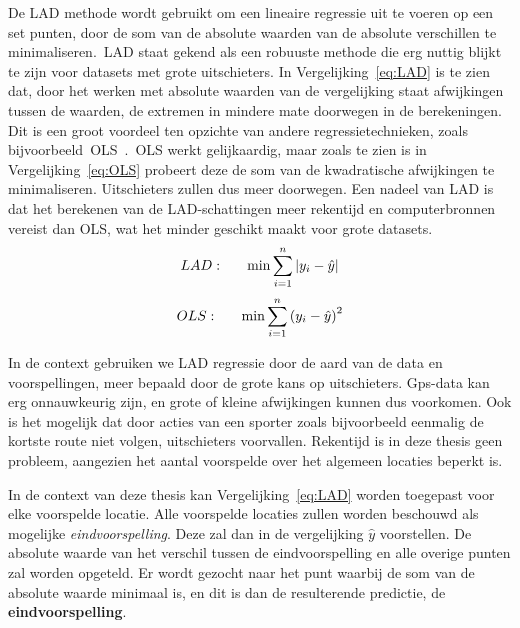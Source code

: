 De \ac{LAD} methode wordt gebruikt om een lineaire regressie uit te voeren op
een set punten, door de som van de absolute waarden van de absolute verschillen
te minimaliseren.\ \ac{LAD} staat gekend als een robuuste methode die erg
nuttig blijkt te zijn voor datasets met grote uitschieters. In
Vergelijking~\ref{eq:LAD} is te zien dat, door het werken met absolute waarden
van de vergelijking staat afwijkingen tussen de waarden, de extremen in mindere
mate doorwegen in de berekeningen. Dit is een groot voordeel ten opzichte van
andere regressietechnieken, zoals
bijvoorbeeld~\ac{OLS}~\cite{iqbal2021application}.~\ac{OLS} werkt gelijkaardig,
maar zoals te zien is in Vergelijking~\ref{eq:OLS} probeert deze de som van de
kwadratische afwijkingen te minimaliseren. Uitschieters zullen dus meer
doorwegen. Een nadeel van \ac{LAD} is dat het berekenen van de LAD-schattingen
meer rekentijd en computerbronnen vereist dan \ac{OLS}, wat het minder geschikt
maakt voor grote datasets.
\begin{equation} \label{eq:LAD}
    LAD:\indent  \min\sum\limits_{i=1}^n|y_i - \hat{y}|
\end{equation}
\begin{equation} \label{eq:OLS}
    OLS:\indent  \min\sum\limits_{i=1}^n{(y_i - \hat{y})}^2
\end{equation}

In de context gebruiken we LAD regressie door de aard van de data en
voorspellingen, meer bepaald door de grote kans op uitschieters. Gps-data kan
erg onnauwkeurig zijn, en grote of kleine afwijkingen kunnen dus voorkomen. Ook
is het mogelijk dat door acties van een sporter zoals bijvoorbeeld eenmalig de
kortste route niet volgen, uitschieters voorvallen. Rekentijd is in deze thesis
geen probleem, aangezien het aantal voorspelde over het algemeen locaties
beperkt is.

In de context van deze thesis kan Vergelijking~\ref{eq:LAD} worden toegepast
voor elke voorspelde locatie. Alle voorspelde locaties zullen worden beschouwd
als mogelijke \textit{eindvoorspelling}. Deze zal dan in de vergelijking
$\hat{y}$ voorstellen. De absolute waarde van het verschil tussen de
eindvoorspelling en alle overige punten zal worden opgeteld. Er wordt gezocht
naar het punt waarbij de som van de absolute waarde minimaal is, en dit is dan
de resulterende predictie, de \textbf{eindvoorspelling}.

